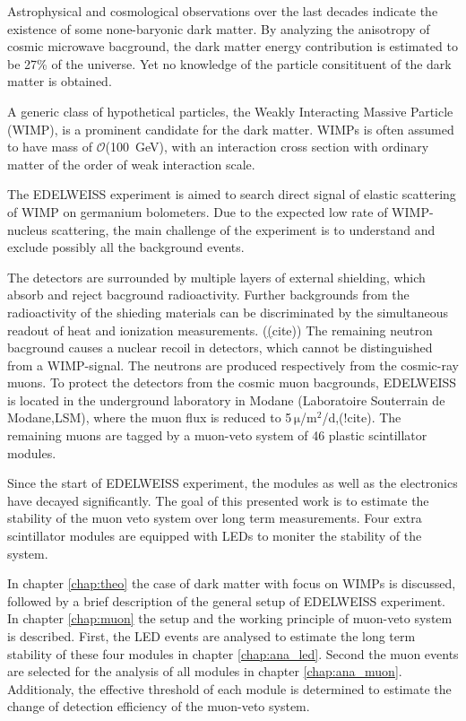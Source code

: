 Astrophysical and cosmological observations over the last decades indicate the existence of some none-baryonic dark matter. By analyzing the anisotropy of cosmic microwave bacground, the dark matter energy contribution is estimated to be 27\% of the universe. Yet no knowledge of the particle consitituent of the dark matter is obtained.

A generic class of hypothetical particles, the Weakly Interacting Massive Particle (WIMP), is a prominent candidate for the dark matter. WIMPs is often assumed to have mass of $\mathcal{O}$(\SI{100}{GeV}), with an interaction cross section with ordinary matter of the order of weak interaction scale.

The EDELWEISS experiment is aimed to search direct signal of elastic scattering of WIMP on germanium bolometers. Due to the expected low rate of WIMP-nucleus scattering, the main challenge of the experiment is to understand and exclude possibly all the background events.

The detectors are surrounded by multiple layers of external shielding, which absorb and reject bacground radioactivity. Further backgrounds from the radioactivity of the shieding materials can be discriminated by the simultaneous readout of heat and ionization measurements. (\underline(cite))  The remaining neutron bacground causes a nuclear recoil in detectors, which cannot be distinguished from a WIMP-signal. The neutrons are produced respectively from the cosmic-ray muons. To protect the detectors from the cosmic muon bacgrounds, EDELWEISS is located in the underground laboratory in Modane (Laboratoire Souterrain de Modane,LSM), where the muon flux is reduced to 5\,$\mathrm{\mu}$/$\mathrm{m}^{2}$/d,(!cite). The remaining muons are tagged by a muon-veto system of 46 plastic scintillator modules.

Since the start of EDELWEISS experiment, the modules as well as the electronics have decayed significantly. The goal of this presented work is to estimate the stability of the muon veto system over long term measurements. Four extra scintillator modules are equipped with LEDs to moniter the stability of the system.

In chapter \ref{chap:theo} the case of dark matter with focus on WIMPs is discussed, followed by a brief description of the general setup of EDELWEISS experiment. In chapter \ref{chap:muon} the setup and the working principle of muon-veto system is described. First, the LED events are analysed to estimate the long term stability of these four modules in chapter \ref{chap:ana_led}. Second the muon events are selected for the analysis of all modules in chapter \ref{chap:ana_muon}. Additionaly, the effective threshold of each module is determined to estimate the change of detection efficiency of the muon-veto system.
